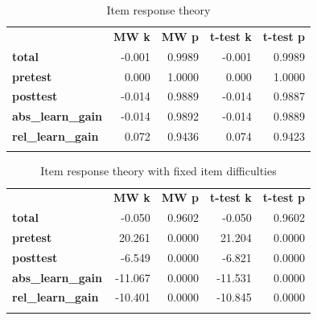 \begin{longtable}[c]{@{}lrrrr@{}}
\caption{Item response theory}
\endfirsthead
\endhead
\toprule\addlinespace
& \textbf{MW k} & \textbf{MW p} &
\textbf{t-test k} & \textbf{t-test p}
\\\addlinespace
\midrule
\textbf{total} & -0.001 & 0.9989 & -0.001 & 0.9989
\\\addlinespace
\textbf{pretest} & 0.000 & 1.0000 & 0.000 & 1.0000
\\\addlinespace
\textbf{posttest} & -0.014 & 0.9889 & -0.014 & 0.9887
\\\addlinespace
\textbf{abs\_learn\_gain} & -0.014 & 0.9892 & -0.014 & 0.9889
\\\addlinespace
\textbf{rel\_learn\_gain} & 0.072 & 0.9436 & 0.074 & 0.9423
\\\addlinespace
\bottomrule
    \label{tab:know_cond_irt_comp}
\end{longtable}

\begin{longtable}[c]{@{}lrrrr@{}}
\caption{Item response theory with fixed item difficulties}
\endfirsthead
\endhead
\toprule\addlinespace
& \textbf{MW k} & \textbf{MW p} &
\textbf{t-test k} & \textbf{t-test p}
\\\addlinespace
\midrule
\textbf{total} & -0.050 & 0.9602 & -0.050 & 0.9602
\\\addlinespace
\textbf{pretest} & 20.261 & 0.0000 & 21.204 & 0.0000
\\\addlinespace
\textbf{posttest} & -6.549 & 0.0000 & -6.821 & 0.0000
\\\addlinespace
\textbf{abs\_learn\_gain} & -11.067 & 0.0000 & -11.531 & 0.0000
\\\addlinespace
\textbf{rel\_learn\_gain} & -10.401 & 0.0000 & -10.845 & 0.0000
\\\addlinespace
\bottomrule
    \label{tab:know_cond_adj_irt_comp}
\end{longtable}

